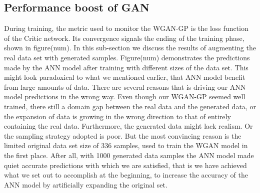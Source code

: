 \documentclass[draft, a4, 10pt, onecolumn]{IEEEtran}
\begin{document}
    \newpage

\subsection{Performance boost of GAN}

During training, the metric used to monitor the WGAN-GP is the loss function of the Critic network. Its convergence signals the ending of the training phase, shown in figure(num).
In this sub-section we discuss the results of augmenting the real data set with generated samples. Figure(num) demonstrates the predictions made by the ANN model after training with different sizes of the data set.
This might look paradoxical to what we mentioned earlier, that ANN model benefit from large amounts of data. There are several reasons that is driving our ANN model predictions in the wrong way. Even though our WGAN-GP seemed well trained, there still a domain gap between the real data and the generated data, or the expansion of data is growing in the wrong direction to that of entirely containing the real data. Furthermore, the generated data might lack realism. Or the sampling strategy adopted is poor. But the most convincing reason is the limited original data set size of 336 samples, used to train the WGAN model in the first place. After all, with 1000 generated data samples the ANN model made quiet accurate predictions with which we are satisfied, that is we have achieved what we set out to accomplish at the beginning, to increase the accuracy of the ANN model by artificially expanding the original set.
\end{document}
